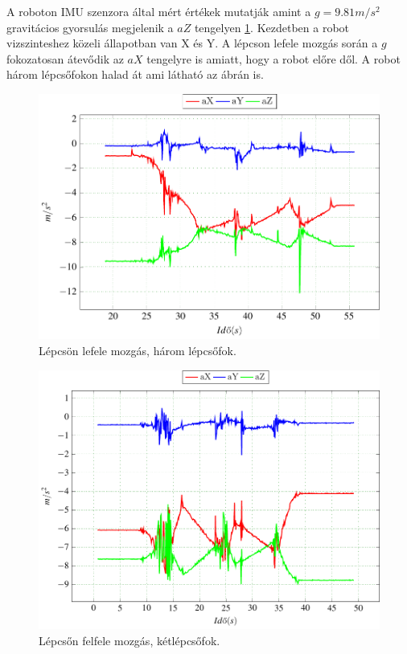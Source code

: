 A roboton IMU szenzora által mért értékek mutatják amint a $g=9.81 m/s^2$ gravitácios gyorsulás megjelenik a $aZ$ tengelyen \ref{fig:ImuLepcsoLe1}. Kezdetben a robot vizszinteshez közeli állapotban van X és Y.  A lépcson lefele mozgás során a $g$ fokozatosan átevődik az $aX$ tengelyre is amiatt, hogy a robot előre dől. A robot három lépcsőfokon halad át ami látható az ábrán is.

\begin{figure}[H]
  \begin{center}
  	\includegraphics[scale=0.8]{tikz/ImuLepcsoLe1.pdf}
  \end{center}
  \caption{Lépcsön lefele mozgás, három lépcsőfok.}
  \label{fig:ImuLepcsoLe1}
\end{figure}

\begin{figure}[H]
  \begin{center}
  	\includegraphics[scale=0.8]{tikz/ImuLepcsoFel1.pdf}
  \end{center}
  \caption{Lépcsőn felfele mozgás, kétlépcsőfok.}
  \label{fig:ImuLepcsoFel1}
\end{figure}

